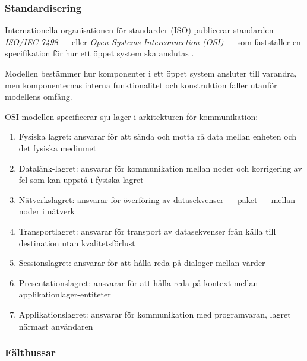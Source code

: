 \documentclass[a4paper,12pt]{article}
\begin{document}
\begin{multicols}{2}
\subsubsection{Standardisering}

Internationella organisationen för standarder (ISO) publicerar standarden \textit{ISO/IEC 7498} --- eller \textit{Open Systems Interconnection (OSI)} --- som fastställer en specifikation för hur ett öppet system ska anslutas \cite{iso74981}.

Modellen bestämmer hur komponenter i ett öppet system ansluter till varandra, men komponenternas interna funktionalitet och konstruktion faller utanför modellens omfång. 


OSI-modellen specificerar sju lager i arkitekturen för kommunikation:

\begin{enumerate}[label={\bfseries(\arabic*)}]
	\item Fysiska lagret: ansvarar för att sända och motta rå data mellan enheten och det fysiska mediumet
	\item Datalänk-lagret: ansvarar för kommunikation mellan noder och korrigering av fel som kan uppstå i fysiska lagret
	\item Nätverkslagret: ansvarar för överföring av datasekvenser --- paket --- mellan noder i nätverk
	\item Transportlagret: ansvarar för transport av datasekvenser från källa till destination utan kvalitetsförlust
	\item Sessionslagret: ansvarar för att hålla reda på dialoger mellan värder
	\item Presentationslagret: ansvarar för att hålla reda på kontext mellan applikationlager-entiteter 
	\item Applikationslagret: ansvarar för kommunikation med programvaran, lagret närmast användaren
\end{enumerate}

\subsubsection{Fältbussar}



\end{multicols}
\end{document}
